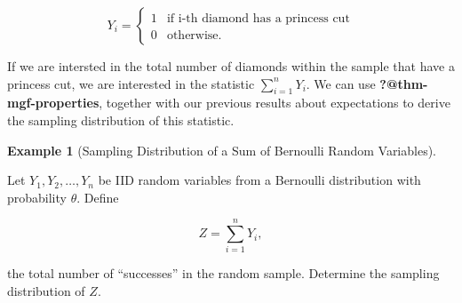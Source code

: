 \documentclass[
  letterpaper,
  DIV=11,
  numbers=noendperiod]{scrreprt}
\theoremstyle{definition}
\theoremstyle{plain}
\theoremstyle{definition}
\newtheorem{example}{Example}[chapter]
\theoremstyle{remark}
\begin{document}
\[Y_i = \begin{cases} 1 & \text{if i-th diamond has a princess cut} \\ 0 & \text{otherwise}. \end{cases}\]

If we are intersted in the total number of diamonds within the sample
that have a princess cut, we are interested in the statistic
\(\sum_{i=1}^{n} Y_i\). We can use \textbf{?@thm-mgf-properties},
together with our previous results about expectations to derive the
sampling distribution of this statistic.

\begin{example}[Sampling Distribution of a Sum of Bernoulli Random
Variables]\protect\hypertarget{exm-bernoulli-sum}{}\label{exm-bernoulli-sum}

Let \(Y_1, Y_2, \dotsc, Y_n\) be IID random variables from a Bernoulli
distribution with probability \(\theta\). Define

\[Z = \sum_{i=1}^{n} Y_i,\]

the total number of ``successes'' in the random sample. Determine the
sampling distribution of \(Z\).

\end{example}
\end{document}
